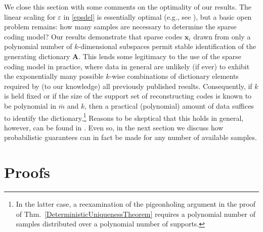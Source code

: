 \documentclass[journal, twocolumn]{IEEEtran}
\begin{document}
We close this section with some comments on the optimality of our results.  The linear scaling for $\varepsilon$ in \eqref{epsdel} is essentially optimal (e.g., see \cite{arias2013fundamental}), but a basic open problem remains: how many samples are necessary to determine the sparse coding model? Our results demonstrate that sparse codes $\mathbf{x}_i$ drawn from only a polynomial number of $k$-dimensional subspaces permit stable identification of the generating dictionary $\mathbf{A}$. This lends some legitimacy to the use of the sparse coding model in practice, where data in general are unlikely (if ever) to exhibit the exponentially many possible $k$-wise combinations of dictionary elements required by (to our knowledge) all previously published results. Consequently, if $k$ is held fixed or if the size of the support set of reconstructing codes is known to be polynomial in $\overline m$ and $k$, then a practical (polynomial) amount of data suffices to identify the dictionary.\footnote{In the latter case, a reexamination of the pigeonholing argument in the proof of Thm.~\ref{DeterministicUniquenessTheorem} requires a polynomial number of samples distributed over a polynomial number of supports.} Reasons to be skeptical that this holds in general, however, can be found in \cite{tillmann2014computational, Tillmann15}. Even so, in the next section we discuss how probabilistic guarantees can in fact be made for any number of available samples.


\section{Proofs}\label{DUT} %

\end{document}
